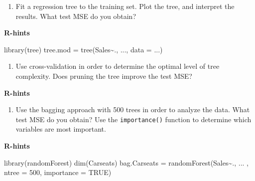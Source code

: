 \documentclass[
]{article}
\newenvironment{Shaded}{\begin{snugshade}}{\end{snugshade}}
\newcommand{\AttributeTok}[1]{\textcolor[rgb]{0.77,0.63,0.00}{#1}}
\newcommand{\ConstantTok}[1]{\textcolor[rgb]{0.00,0.00,0.00}{#1}}
\newcommand{\DecValTok}[1]{\textcolor[rgb]{0.00,0.00,0.81}{#1}}
\newcommand{\FunctionTok}[1]{\textcolor[rgb]{0.00,0.00,0.00}{#1}}
\newcommand{\NormalTok}[1]{#1}
\newcommand{\OtherTok}[1]{\textcolor[rgb]{0.56,0.35,0.01}{#1}}
\newcommand{\SpecialCharTok}[1]{\textcolor[rgb]{0.00,0.00,0.00}{#1}}
\providecommand{\tightlist}{%
  \setlength{\itemsep}{0pt}\setlength{\parskip}{0pt}}
\begin{document}
\begin{enumerate}
\def\labelenumi{\alph{enumi})}
\setcounter{enumi}{1}
\tightlist
\item
  Fit a regression tree to the training set. Plot the tree, and
  interpret the results. What test MSE do you obtain?
\end{enumerate}

\textbf{R-hints}

\begin{Shaded}
\begin{Highlighting}[]
\FunctionTok{library}\NormalTok{(tree)}
\NormalTok{tree.mod }\OtherTok{=} \FunctionTok{tree}\NormalTok{(Sales}\SpecialCharTok{\textasciitilde{}}\NormalTok{., ..., }\AttributeTok{data =}\NormalTok{ ...)}
\end{Highlighting}
\end{Shaded}

\begin{enumerate}
\def\labelenumi{\alph{enumi})}
\setcounter{enumi}{2}
\tightlist
\item
  Use cross-validation in order to determine the optimal level of tree
  complexity. Does pruning the tree improve the test MSE?
\end{enumerate}

\textbf{R-hints}

\begin{Shaded}
\end{Shaded}

\begin{enumerate}
\def\labelenumi{\alph{enumi})}
\setcounter{enumi}{3}
\tightlist
\item
  Use the bagging approach with 500 trees in order to analyze the data.
  What test MSE do you obtain? Use the \texttt{importance()} function to
  determine which variables are most important.
\end{enumerate}

\textbf{R-hints}

\begin{Shaded}
\begin{Highlighting}[]
\FunctionTok{library}\NormalTok{(randomForest)}
\FunctionTok{dim}\NormalTok{(Carseats)}
\NormalTok{bag.Carseats }\OtherTok{=} \FunctionTok{randomForest}\NormalTok{(Sales}\SpecialCharTok{\textasciitilde{}}\NormalTok{., ... , }\AttributeTok{ntree =} \DecValTok{500}\NormalTok{, }\AttributeTok{importance =} \ConstantTok{TRUE}\NormalTok{)}
\end{Highlighting}
\end{Shaded}
\end{document}
